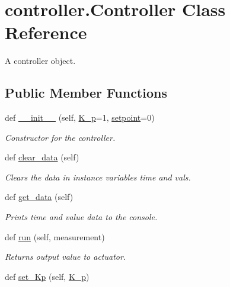 \hypertarget{classcontroller_1_1_controller}{}\section{controller.\+Controller Class Reference}
\label{classcontroller_1_1_controller}


A controller object.  


\subsection*{Public Member Functions}
\begin{DoxyCompactItemize}
\item 
def \mbox{\hyperlink{classcontroller_1_1_controller_a6a7ea9c3701a0d3fc752bd898c8fb2a3}{\+\_\+\+\_\+init\+\_\+\+\_\+}} (self, \mbox{\hyperlink{classcontroller_1_1_controller_a6147d7f8aa12e56ef01036ddd2b55ee9}{K\+\_\+p}}=1, \mbox{\hyperlink{classcontroller_1_1_controller_ace8a70b35ea15f3f7b6548c64aee1e48}{setpoint}}=0)
\begin{DoxyCompactList}\small\item\em Constructor for the controller. \end{DoxyCompactList}\item 
def \mbox{\hyperlink{classcontroller_1_1_controller_a7e3a8cc2bca705811459c49ec7548f64}{clear\+\_\+data}} (self)
\begin{DoxyCompactList}\small\item\em Clears the data in instance variables time and vals. \end{DoxyCompactList}\item 
def \mbox{\hyperlink{classcontroller_1_1_controller_a035f659090efe04d8db8e9ad30a4d61e}{get\+\_\+data}} (self)
\begin{DoxyCompactList}\small\item\em Prints time and value data to the console. \end{DoxyCompactList}\item 
def \mbox{\hyperlink{classcontroller_1_1_controller_a960dfc22275e951cf58fb9902460cc83}{run}} (self, measurement)
\begin{DoxyCompactList}\small\item\em Returns output value to actuator. \end{DoxyCompactList}\item 
def \mbox{\hyperlink{classcontroller_1_1_controller_a467766c3be5989bb97d078288b5aee8d}{set\+\_\+\+Kp}} (self, \mbox{\hyperlink{classcontroller_1_1_controller_a6147d7f8aa12e56ef01036ddd2b55ee9}{K\+\_\+p}})

\end{DoxyCompactItemize}
